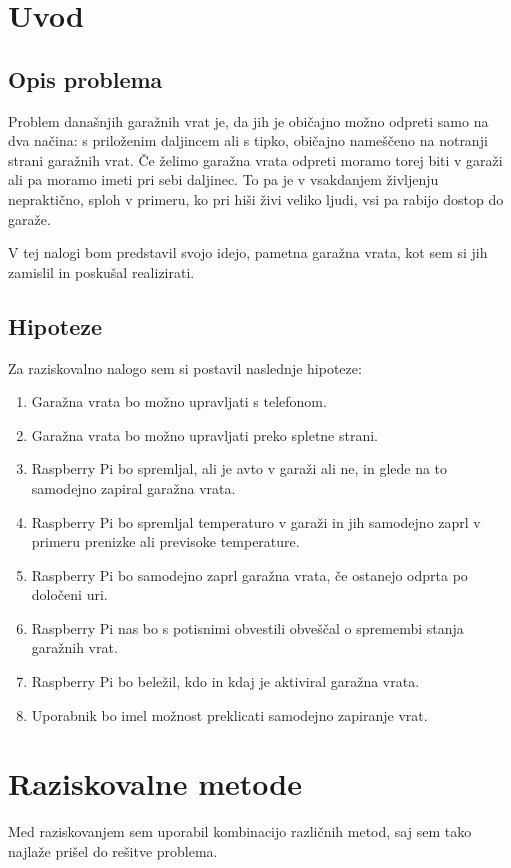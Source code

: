 \documentclass[11pt]{article}
\begin{document}

\newpage
{}
\setcounter{page}{6}
\section{Uvod}
\subsection{Opis problema}
Problem današnjih garažnih vrat je, da jih je običajno možno odpreti samo na dva načina: s priloženim daljincem ali s tipko, običajno nameščeno na notranji strani garažnih vrat. Če želimo garažna vrata odpreti moramo torej biti v garaži ali pa moramo imeti pri sebi daljinec. To pa je v vsakdanjem življenju nepraktično, sploh v primeru, ko pri hiši živi veliko ljudi, vsi pa rabijo dostop do garaže.

V tej nalogi bom predstavil svojo idejo, pametna garažna vrata, kot sem si jih zamislil in poskušal realizirati.

\subsection{Hipoteze}
Za raziskovalno nalogo sem si postavil naslednje hipoteze:
\begin{enumerate}
    \item Garažna vrata bo možno upravljati s telefonom.
    \item Garažna vrata bo možno upravljati preko spletne strani.
    \item Raspberry Pi bo spremljal, ali je avto v garaži ali ne, in glede na to samodejno zapiral garažna vrata.
    \item Raspberry Pi bo spremljal temperaturo v garaži in jih samodejno zaprl v primeru prenizke ali previsoke temperature.
    \item Raspberry Pi bo samodejno zaprl garažna vrata, če ostanejo odprta po določeni uri.
    \item Raspberry Pi nas bo s potisnimi obvestili obveščal o spremembi stanja garažnih vrat.
    \item Raspberry Pi bo beležil, kdo in kdaj je aktiviral garažna vrata.
    \item Uporabnik bo imel možnost preklicati samodejno zapiranje vrat.
\end{enumerate}

\section{Raziskovalne metode}
Med raziskovanjem sem uporabil kombinacijo različnih metod, saj sem tako najlaže prišel do rešitve problema.
\end{document}
